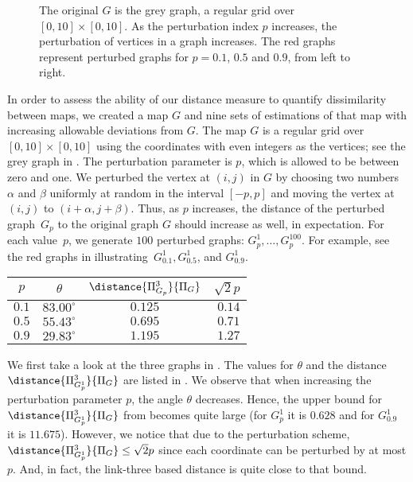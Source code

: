 \begin{figure}[hb]
\centering
{}
\hspace{1cm}
\hspace{1cm}
\caption{The original $G$ is the grey graph, a
regular grid over $\left[0, 10\right] \times \left[0, 10\right]$. As the perturbation
index $p$ increases, the perturbation of vertices in a graph increases.
The red graphs represent perturbed graphs for $p = 0.1$, $0.5$ and $0.9$, 
from left to right.}
\label{fig-pGraphs}
\end{figure}


In order to assess the ability of our distance measure to quantify dissimilarity 
between 
maps, we created a map $G$ and nine sets of estimations of that map with
increasing allowable deviations from $G$.  The map $G$ is a regular grid over
$[0,10] \times [0,10]$ using the coordinates with even integers as the
vertices; see the grey graph in .
The perturbation parameter is $p$, which is allowed to be between zero and one.  
We perturbed
the vertex at
$(i,j)$ in $G$ by choosing two numbers $\alpha$ and $\beta$ uniformly at random in the
interval $[-p,p]$ and moving the vertex at $(i,j)$ to $(i+\alpha,j+\beta)$.
Thus, as $p$ increases, the distance of the perturbed graph~$G_p$ to the 
original graph $G$ should increase as well, in expectation.  For each
value~$p$, 
we generate $100$ perturbed graphs: $G_p^1, \ldots, G_p^{100}$. For example,
see 
the red graphs in  illustrating~$G_{0.1}^1,
G_{0.5}^1$, and $G_{0.9}^1$.


\begin{table}[bht]
{
\begin{tabular}{|r|l|c|r|}
\hline
\multicolumn{1}{|c|}{$p$} & \multicolumn{1}{c|}{$\theta$} & 
\multicolumn{1}{c|}{$\distance{\Pi^3_{G_p}}{\Pi_G}$} &
\multicolumn{1}{c|}{$\sqrt{2}p$}
\\\hline\hline
$0.1$ & $83.00^\circ$ & $0.125$ & $0.14$ \\\hline
$0.5$ & $55.43^\circ$ & $0.695$ & $0.71$ \\\hline
$0.9$ & $29.83^\circ$ & $1.195$ & $1.27$ \\
\hline
\end{tabular}
}
\end{table}
We first take a look at the three graphs in .
The values for $\theta$ and the distance $\distance{\Pi^3_{G_p^1}}{\Pi_G}$
 are listed in . 
We observe that when increasing the perturbation  parameter $p$, the angle 
$\theta$ decreases.  Hence, the upper bound for
$\distance{\Pi^3_{G_p^1}}{\Pi_G}$ from  becomes
quite large (for $G_{p}^1$ it is $0.628$ and for $G_{0.9}^1$ it is $11.675$).
However, we notice that due to the perturbation scheme,
$\distance{\Pi^3_{G_p^1}}{\Pi_G} \leq \sqrt{2}p$ since each coordinate can be
perturbed by at most $p$. And, in fact, the link-three based distance is quite
close to that bound.


